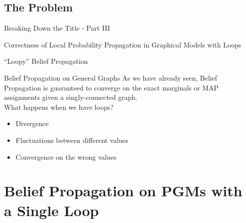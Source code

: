 \documentclass{beamer}
\begin{document}

\subsection{The Problem}
\begin{frame}{Breaking Down the Title - Part III}
    \begin{center}
        \Large{Correctness of \alert<1>{Local Probability Propagation} in Graphical Models with \alert<2>{Loops}}
    \end{center}
\end{frame}
\begin{frame}{``Loopy'' Belief Propagation}
    \begin{block}{Belief Propagation on General Graphs}
        As we have already seen, Belief Propagation is guaranteed to converge on the exact marginals or MAP assignments given a singly-connected graph.\\
        What happens when we have loops?
        \pause
        \begin{itemize}[<+->]
            \item Divergence
            \item Fluctuations between different values
            \item Convergence on the wrong values
        \end{itemize}
    \end{block}
\end{frame}
\section{Belief Propagation on PGMs with a Single Loop}
\end{document}
